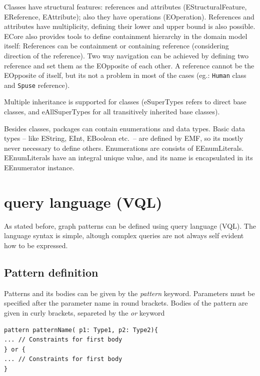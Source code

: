 Classes have structural features: references and attributes (EStructuralFeature, EReference, EAttribute); also they have operations (EOperation).
References and attributes have multiplicity, defining their lower and upper bound is also possible.
ECore also provides tools to define containment hierarchy in the domain model itself: References can be containment or containing reference (considering direction of the reference). 
Two way navigation can be achieved by defining two reference and set them as the EOpposite of each other. A reference cannot be the EOpposite of itself, but its not a problem in most of the cases (eg.: \texttt{Human} class and \texttt{Spuse} reference). 

Multiple inheritance is supported for classes (eSuperTypes refers to direct base classes, and eAllSuperTypes for all transitively inherited base classes).

Besides classes, packages can contain enumerations and data types. 
Basic data types -- like EString, EInt, EBoolean etc.\ -- are defined by EMF, so its mostly never necessary to define others.
Enumerations are consists of EEnumLiterals. 
EEnumLiterals have an integral unique value, and its name is encapsulated in its EEnumerator instance.



	

\section{\viatra{} query language (VQL)}

As stated before, graph patterns can be defined using \viatra{} query language (VQL). 
The language syntax is simple, altough complex queries are not always self evident how to be expressed.

\subsection{Pattern definition}
Patterns and its bodies can be given by the \emph{pattern} keyword. 
Parameters must be specified after the parameter name in round brackets. 
Bodies of the pattern are given in curly brackets, separeted by the \emph{or} keyword

\begin{minipage}{\textwidth}
\begin{lstlisting}[language=vql]
pattern patternName( p1: Type1, p2: Type2){
... // Constraints for first body
} or {
... // Constraints for first body
}
\end{lstlisting}
\end{minipage}


